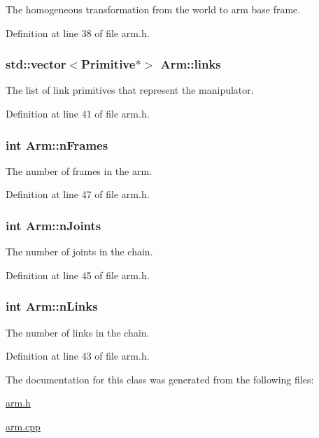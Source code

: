 The homogeneous transformation from the world to arm base frame. 



Definition at line 38 of file arm.\+h.

\subsubsection[{\texorpdfstring{links}{links}}]{\setlength{\rightskip}{0pt plus 5cm}std\+::vector$<${\bf Primitive}$\ast$$>$ Arm\+::links}\hypertarget{class_arm_a427fb95641bb8d0886b2849f0bda36be}{}\label{class_arm_a427fb95641bb8d0886b2849f0bda36be}


The list of link primitives that represent the manipulator. 



Definition at line 41 of file arm.\+h.

\subsubsection[{\texorpdfstring{n\+Frames}{nFrames}}]{\setlength{\rightskip}{0pt plus 5cm}int Arm\+::n\+Frames}\hypertarget{class_arm_ac7955a5e8e9c6681b55d0d80d7e31df7}{}\label{class_arm_ac7955a5e8e9c6681b55d0d80d7e31df7}


The number of frames in the arm. 



Definition at line 47 of file arm.\+h.

\subsubsection[{\texorpdfstring{n\+Joints}{nJoints}}]{\setlength{\rightskip}{0pt plus 5cm}int Arm\+::n\+Joints}\hypertarget{class_arm_ac3734a2ca38b0312fd42894ab6886bc9}{}\label{class_arm_ac3734a2ca38b0312fd42894ab6886bc9}


The number of joints in the chain. 



Definition at line 45 of file arm.\+h.

\subsubsection[{\texorpdfstring{n\+Links}{nLinks}}]{\setlength{\rightskip}{0pt plus 5cm}int Arm\+::n\+Links}\hypertarget{class_arm_a911ba9a8c719c090a305f88ab0ae7490}{}\label{class_arm_a911ba9a8c719c090a305f88ab0ae7490}


The number of links in the chain. 



Definition at line 43 of file arm.\+h.



The documentation for this class was generated from the following files\+:\begin{DoxyCompactItemize}
\item 
\hyperlink{arm_8h}{arm.\+h}\item 
\hyperlink{arm_8cpp}{arm.\+cpp}\end{DoxyCompactItemize}
